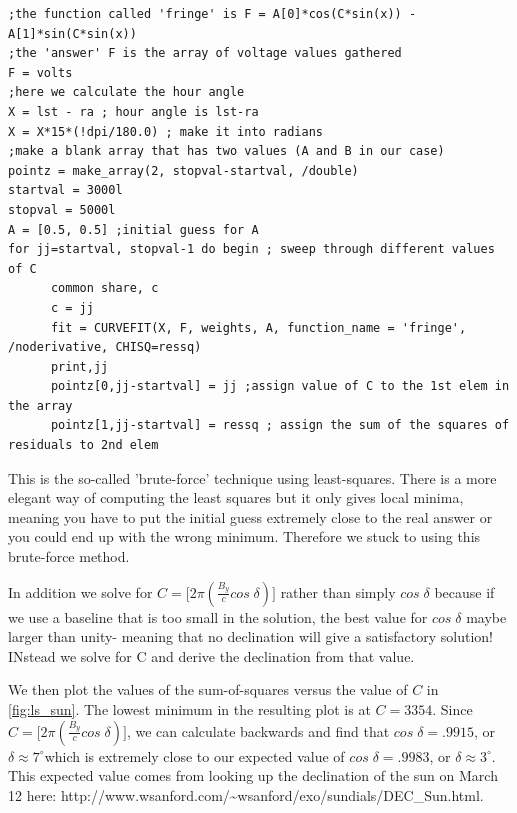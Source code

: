 \documentclass{article}
\begin{document}
\lstset{basicstyle=\footnotesize}


\begin{lstlisting}[frame=single]
;the function called 'fringe' is F = A[0]*cos(C*sin(x)) - A[1]*sin(C*sin(x))
;the 'answer' F is the array of voltage values gathered
F = volts
;here we calculate the hour angle
X = lst - ra ; hour angle is lst-ra
X = X*15*(!dpi/180.0) ; make it into radians
;make a blank array that has two values (A and B in our case)
pointz = make_array(2, stopval-startval, /double)
startval = 3000l
stopval = 5000l
A = [0.5, 0.5] ;initial guess for A
for jj=startval, stopval-1 do begin ; sweep through different values of C
      common share, c
      c = jj
      fit = CURVEFIT(X, F, weights, A, function_name = 'fringe', /noderivative, CHISQ=ressq)
      print,jj
      pointz[0,jj-startval] = jj ;assign value of C to the 1st elem in the array
      pointz[1,jj-startval] = ressq ; assign the sum of the squares of residuals to 2nd elem

\end{lstlisting}

This is the so-called 'brute-force' technique using least-squares. There is a more elegant way of computing the least squares but it only gives local minima, meaning you have to put the initial guess extremely close to the real answer or you could end up with the wrong minimum. Therefore we stuck to using this brute-force method.

In addition we solve for $C = \bigg[2\pi( \frac{B_y}{c}cos\;\delta )\bigg]$ rather than simply $cos\;\delta$ because if we use a baseline that is too small in the solution, the best value for $cos\;\delta$ maybe larger than unity- meaning that no declination will give a satisfactory solution! INstead we solve for C and derive the declination from that value.

We then plot the values of the sum-of-squares versus the value of $C$ in \autoref{fig:ls_sun}. The lowest minimum in the resulting plot is at $C=3354$. Since $C = \bigg[2\pi( \frac{B_y}{c}cos\;\delta )\bigg]$, we can calculate backwards and find that $cos\; \delta = .9915$, or $\delta\approx7^\circ$which is extremely close to our expected value of $cos\;\delta=.9983$, or $\delta\approx3^\circ$. This expected value comes from looking up the declination of the sun on March 12 here: http://www.wsanford.com/\~{}wsanford/exo/sundials/DEC\_Sun.html.
\end{document}
